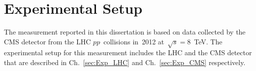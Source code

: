 \chapter{Experimental Setup} %
\label{sec:Exp}

The measurement reported in this dissertation is based on data collected by the CMS detector from the LHC $pp$~collisions in~2012 at~$\sqrt{s}=$8~TeV. The experimental setup for this measurement includes the LHC and the CMS detector that are described in Ch.~\ref{sec:Exp_LHC} and Ch.~\ref{sec:Exp_CMS} respectively. 

